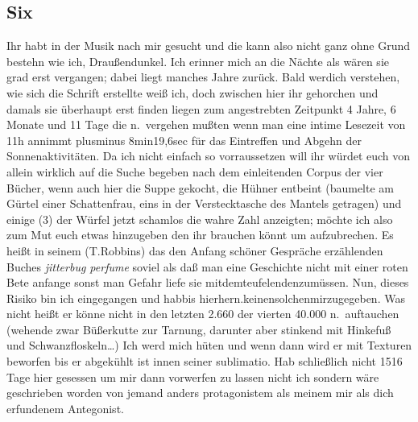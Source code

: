 \documentclass[
]{article}
\author{}
\date{\vspace{-2.5em}}
\begin{document}
\subsection{Six}\label{six}

Ihr habt in der Musik nach mir gesucht und die kann also nicht ganz ohne
Grund bestehn wie ich, Draußendunkel. Ich erinner mich an die Nächte als
wären sie grad erst vergangen; dabei liegt manches Jahre zurück. Bald
werdich verstehen, wie sich die Schrift erstellte weiß ich, doch
zwischen hier ihr gehorchen und damals sie überhaupt erst finden liegen
zum angestrebten Zeitpunkt 4 Jahre, 6 Monate und 11 Tage die n.~vergehen
mußten wenn man eine intime Lesezeit von 11h annimmt plusminus
8min19,6sec für das Eintreffen und Abgehn der Sonnenaktivitäten. Da ich
nicht einfach so vorraussetzen will ihr würdet euch von allein wirklich
auf die Suche begeben nach dem einleitenden Corpus der vier Bücher, wenn
auch hier die Suppe gekocht, die Hühner entbeint (baumelte am Gürtel
einer Schattenfrau, eins in der Verstecktasche des Mantels getragen) und
einige (3) der Würfel jetzt schamlos die wahre Zahl anzeigten; möchte
ich also zum Mut euch etwas hinzugeben den ihr brauchen könnt um
aufzubrechen. Es heißt in seinem (T.Robbins) das den Anfang schöner
Gespräche erzählenden Buches \emph{jitterbug perfume} soviel als daß man
eine Geschichte nicht mit einer roten Bete anfange sonst man Gefahr
liefe sie mitdemteufelendenzumüssen. Nun, dieses Risiko bin ich
eingegangen und habbis hierhern.keinensolchenmirzugegeben. Was nicht
heißt er könne nicht in den letzten 2.660 der vierten 40.000
n.~auftauchen (wehende zwar Büßerkutte zur Tarnung, darunter aber
stinkend mit Hinkefuß und Schwanzfloskeln\ldots) Ich werd mich hüten und
wenn dann wird er mit Texturen beworfen bis er abgekühlt ist innen
seiner sublimatio. Hab schließlich nicht 1516 Tage hier gesessen um mir
dann vorwerfen zu lassen nicht ich sondern wäre geschrieben worden von
jemand anders protagonistem als meinem mir als dich erfundenem
Antegonist.
\end{document}
